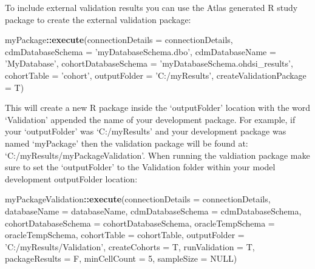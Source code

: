 \documentclass[
]{article}
\newenvironment{Shaded}{\begin{snugshade}}{\end{snugshade}}
\newcommand{\DataTypeTok}[1]{\textcolor[rgb]{0.13,0.29,0.53}{#1}}
\newcommand{\DecValTok}[1]{\textcolor[rgb]{0.00,0.00,0.81}{#1}}
\newcommand{\KeywordTok}[1]{\textcolor[rgb]{0.13,0.29,0.53}{\textbf{#1}}}
\newcommand{\NormalTok}[1]{#1}
\newcommand{\OperatorTok}[1]{\textcolor[rgb]{0.81,0.36,0.00}{\textbf{#1}}}
\newcommand{\OtherTok}[1]{\textcolor[rgb]{0.56,0.35,0.01}{#1}}
\newcommand{\StringTok}[1]{\textcolor[rgb]{0.31,0.60,0.02}{#1}}
\begin{document}
To include external validation results you can use the Atlas generated R
study package to create the external validation package:

\begin{Shaded}
\begin{Highlighting}[]
\NormalTok{myPackage}\OperatorTok{::}\KeywordTok{execute}\NormalTok{(}\DataTypeTok{connectionDetails =}\NormalTok{ connectionDetails,}
        \DataTypeTok{cdmDatabaseSchema =} \StringTok{'myDatabaseSchema.dbo'}\NormalTok{,}
        \DataTypeTok{cdmDatabaseName =} \StringTok{'MyDatabase'}\NormalTok{,}
        \DataTypeTok{cohortDatabaseSchema =} \StringTok{'myDatabaseSchema.ohdsi_results'}\NormalTok{,}
        \DataTypeTok{cohortTable =} \StringTok{'cohort'}\NormalTok{,}
        \DataTypeTok{outputFolder =} \StringTok{'C:/myResults'}\NormalTok{,}
        \DataTypeTok{createValidationPackage =}\NormalTok{ T)}
\end{Highlighting}
\end{Shaded}

This will create a new R package inside the `outputFolder' location with
the word `Validation' appended the name of your development package. For
example, if your `outputFolder' was `C:/myResults' and your development
package was named `myPackage' then the validation package will be found
at: `C:/myResults/myPackageValidation'. When running the valdiation
package make sure to set the `outputFolder' to the Validation folder
within your model development outputFolder location:

\begin{Shaded}
\begin{Highlighting}[]
\NormalTok{myPackageValidation}\OperatorTok{::}\KeywordTok{execute}\NormalTok{(}\DataTypeTok{connectionDetails =}\NormalTok{ connectionDetails,}
                 \DataTypeTok{databaseName =}\NormalTok{ databaseName,}
                 \DataTypeTok{cdmDatabaseSchema =}\NormalTok{ cdmDatabaseSchema,}
                 \DataTypeTok{cohortDatabaseSchema =}\NormalTok{ cohortDatabaseSchema,}
                 \DataTypeTok{oracleTempSchema =}\NormalTok{ oracleTempSchema,}
                 \DataTypeTok{cohortTable =}\NormalTok{ cohortTable,}
                 \DataTypeTok{outputFolder =} \StringTok{'C:/myResults/Validation'}\NormalTok{,}
                 \DataTypeTok{createCohorts =}\NormalTok{ T,}
                 \DataTypeTok{runValidation =}\NormalTok{ T,}
                 \DataTypeTok{packageResults =}\NormalTok{ F,}
                 \DataTypeTok{minCellCount =} \DecValTok{5}\NormalTok{,}
                 \DataTypeTok{sampleSize =} \OtherTok{NULL}\NormalTok{)}
\end{Highlighting}
\end{Shaded}
\end{document}
